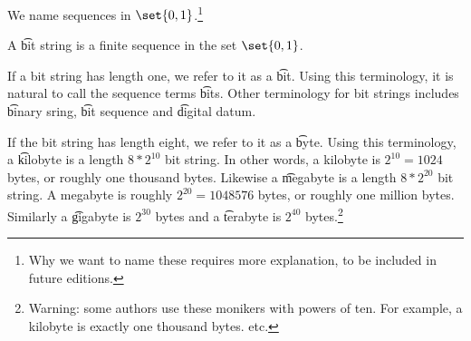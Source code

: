 

We name sequences in $\set{0, 1}$.\footnote{Why we want to name these requires more explanation, to be included in future editions.}


A \t{bit string} is a finite sequence in the set $\set{0, 1}$.

If a bit string has length one, we refer to it as a \t{bit}.
Using this terminology, it is natural to call the sequence terms \t{bits}.
Other terminology for bit strings includes \t{binary sring}, \t{bit sequence} and \t{digital datum}.

If the bit string has length eight, we refer to it as a \t{byte}.
Using this terminology, a \t{kilobyte} is a length $8 * 2^{10}$ bit string.
In other words, a kilobyte is $2^{10} = 1024$ bytes, or roughly one thousand bytes.
Likewise a \t{megabyte} is a length $8 * 2^{20}$ bit string.
A megabyte is roughly $2^{20} = 1048576$ bytes, or roughly one million bytes.
Similarly a \t{gigabyte} is $2^{30}$ bytes and a \t{terabyte} is $2^{40}$ bytes.\footnote{Warning: some authors use these monikers with powers of ten. For example, a kilobyte is exactly one thousand bytes. etc.}

\blankpage
